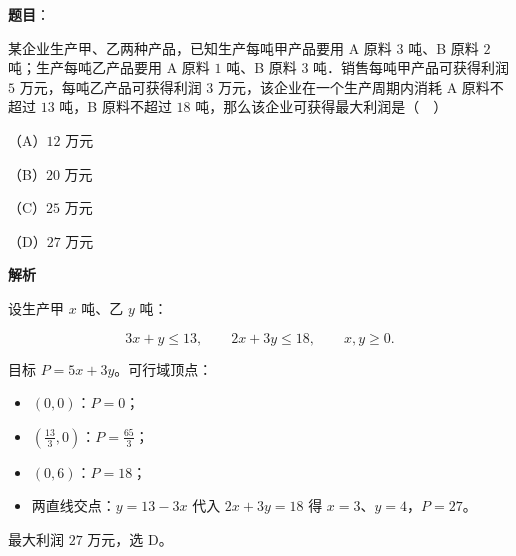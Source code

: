 \begin{answer}

\textbf{题目}：

某企业生产甲、乙两种产品，已知生产每吨甲产品要用 A 原料 $3$ 吨、B 原料 $2$ 吨；生产每吨乙产品要用 A 原料 $1$ 吨、B 原料 $3$ 吨．销售每吨甲产品可获得利润 $5$ 万元，每吨乙产品可获得利润 $3$ 万元，该企业在一个生产周期内消耗 A 原料不超过 $13$ 吨，B 原料不超过 $18$ 吨，那么该企业可获得最大利润是（　）

（A）$12$ 万元

（B）$20$ 万元

（C）$25$ 万元

（D）$27$ 万元

\textbf{解析}

设生产甲 $x$ 吨、乙 $y$ 吨：

\nopagebreak[4]
\[3x+y\leqslant13,\qquad 2x+3y\leqslant18,\qquad x,y\geqslant0 .\]

目标 $P=5x+3y$。可行域顶点：

\begin{itemize}
\item $(0,0)$：$P=0$；
\item $\left(\frac{13}{3},0\right)$：$P=\frac{65}{3}$；
\item $(0,6)$：$P=18$；
\item 两直线交点：$y=13-3x$ 代入 $2x+3y=18$ 得 $x=3$、$y=4$，$P=27$。
\end{itemize}

最大利润 $27$ 万元，选 D。


\end{answer}
